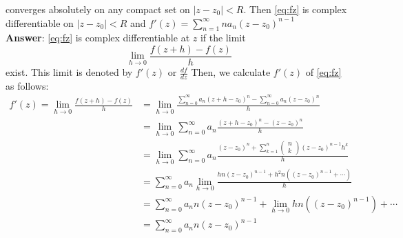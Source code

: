 \documentclass[a4paper,12pt]{article}
\begin{document}
\begin{enumerate}
	converges absolutely on any compact set on ${|z-z_0|<R}$. Then \eqref{eq:fz} is complex differentiable on ${|z-z_0|<R}$ and $f'(z) = \sum_{n=1}^{\infty} n a_n(z-z_0)^{n-1}$\\
	\newline
	\textbf{Answer}:
	\eqref{eq:fz} is complex differentiable at $z$ if the limit
	\begin{equation}\label{eq:df}
	\lim_{h\to 0}\frac{f(z+h) - f(z)}{h}
	\end{equation} exist. This limit is denoted by $f'(z)$ or $\frac{df}{dz}$ Then, we calculate $f'(z)$ of \eqref{eq:fz} as follows:
	\begin{equation}
	\begin{aligned}
	f'(z) = \lim_{h\to 0}\frac{f(z+h) - f(z)}{h} &= \lim_{h\to 0}\frac{\sum_{n=0}^{\infty} a_n(z+h-z_0)^n - \sum_{n=0}^{\infty} a_n(z-z_0)^n}{h}\\
	&= \lim_{h\to 0}\sum_{n=0}^{\infty} a_n\frac{(z+h-z_0)^n - (z-z_0)^n}{h}\\
	&= \lim_{h\to 0}\sum_{n=0}^{\infty} a_n\frac{(z-z_0)^n + \sum_{k=1}^{n}\begin{pmatrix}
		n\\
		k
		\end{pmatrix}(z-z_0)^{n-1}h^k}{h}\\
	&= \sum_{n=0}^{\infty} a_n\lim_{h\to 0}\frac{hn(z-z_0)^{n-1} + h^2n((z-z_0)^{n-1} + \cdots)}{h}\\
	&= \sum_{n=0}^{\infty} a_n n(z-z_0)^{n-1} + \lim_{h\to 0}hn((z-z_0)^{n-1}) + \cdots\\
	&= \sum_{n=0}^{\infty} a_n n(z-z_0)^{n-1}\\
	\end{aligned}
	\end{equation}
\end{enumerate}
\end{document}
